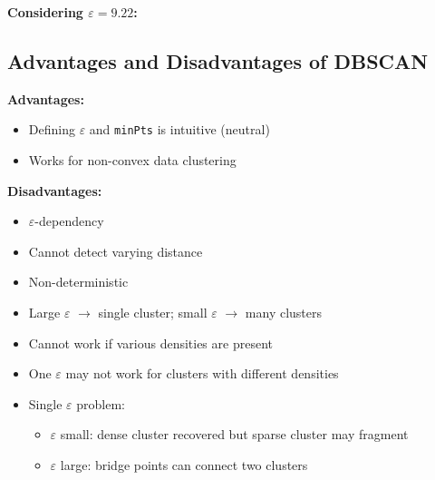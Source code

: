 \documentclass[12pt,a4paper]{article}
\begin{document}
\begin{examplebox}
\textbf{Considering $\varepsilon = 9.22$:}
\end{examplebox}

\subsection{Advantages and Disadvantages of DBSCAN}

\begin{minipage}[t]{0.48\textwidth}
\textbf{Advantages:}
\begin{itemize}
  \item Defining $\varepsilon$ and \texttt{minPts} is intuitive (neutral)
  \item Works for non-convex data clustering
\end{itemize}
\end{minipage}
\hfill
\begin{minipage}[t]{0.48\textwidth}
\textbf{Disadvantages:}
\begin{itemize}
  \item $\varepsilon$-dependency
  \item Cannot detect varying distance
  \item Non-deterministic
  \item Large $\varepsilon$ $\to$ single cluster; small $\varepsilon$ $\to$ many clusters
  \item Cannot work if various densities are present
  \item One $\varepsilon$ may not work for clusters with different densities
  \item Single $\varepsilon$ problem:
        \begin{itemize}
          \item $\varepsilon$ small: dense cluster recovered but sparse cluster may fragment
          \item $\varepsilon$ large: bridge points can connect two clusters
        \end{itemize}
\end{itemize}
\end{minipage}
\end{document}
